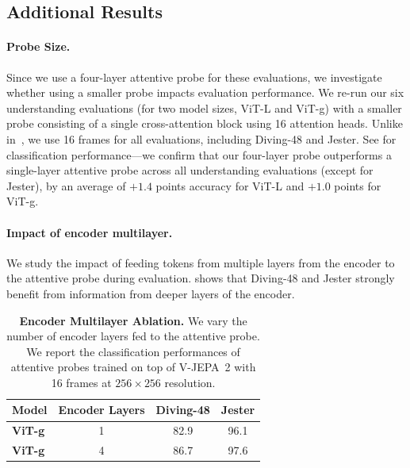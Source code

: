\documentclass[]{fairmeta}
\newcommand{\model}{V-JEPA~2\xspace}
\begin{document}
\subsection{Additional Results} \label{app:probe_understanding_add_res}

\paragraph{\bf Probe Size.} Since we use a four-layer attentive probe for these evaluations, we investigate whether using a smaller probe impacts evaluation performance. We re-run our six understanding evaluations (for two model sizes, ViT-L and ViT-g) with a smaller probe consisting of a single cross-attention block using 16 attention heads. Unlike in~, we use 16 frames for all evaluations, including Diving-48 and Jester. See  for classification performance---we confirm that our four-layer probe outperforms a single-layer attentive probe across all understanding evaluations (except for Jester), by an average of $+1.4$ points accuracy for ViT-L and $+1.0$ points for ViT-g.


\paragraph{\bf Impact of encoder multilayer.} We study the impact of feeding tokens from multiple layers from the encoder to the attentive probe during evaluation.  shows that Diving-48 and Jester strongly benefit from information from deeper layers of the encoder.

\begin{table}[t]
    \small
    \caption{\small{\bf Encoder Multilayer Ablation.} \small We vary the number of encoder layers fed to the attentive probe. We report the classification performances of attentive probes trained on top of \model with 16 frames at $256\times256$ resolution.}
    \centering
    \label{tab:encoder_multilayer}
    \begin{tabular}{l c c c}
        \\
        \toprule
        \bf Model & \bf Encoder Layers & \bf Diving-48  & \bf Jester \\
        \toprule
        \bf ViT-g & 1 & 82.9 & 96.1 \\
        \bf ViT-g & 4 & 86.7 & 97.6 \\
        \bottomrule
    \end{tabular}
\end{table}
\end{document}
